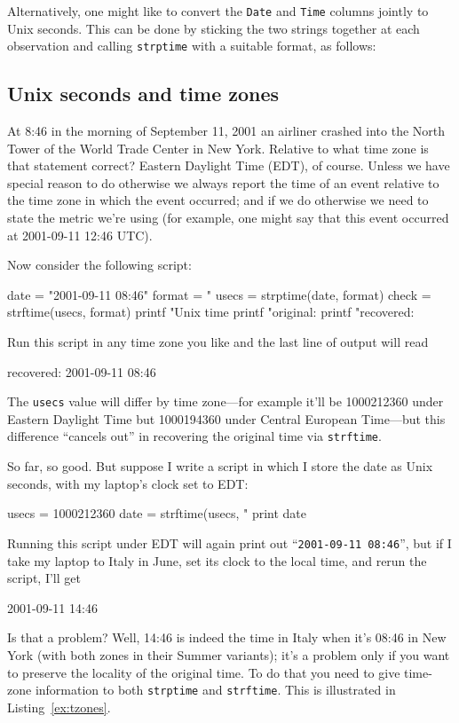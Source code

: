 Alternatively, one might like to convert the \texttt{Date} and
\texttt{Time} columns jointly to Unix seconds. This can be done by
sticking the two strings together at each observation and calling
\texttt{strptime} with a suitable format, as follows:
%

\subsection{Unix seconds and time zones}

At 8:46 in the morning of September 11, 2001 an airliner crashed into
the North Tower of the World Trade Center in New York. Relative to
what time zone is that statement correct? Eastern Daylight Time (EDT),
of course. Unless we have special reason to do otherwise we always
report the time of an event relative to the time zone in which the
event occurred; and if we do otherwise we need to state the metric
we're using (for example, one might say that this event occurred at
2001-09-11 12:46 UTC).

Now consider the following script:
%
\begin{code}
date = "2001-09-11 08:46"
format = "%
usecs = strptime(date, format)
check = strftime(usecs, format)
printf "Unix time %
printf "original:  %
printf "recovered: %
\end{code}

Run this script in any time zone you like and the last line of output
will read
\begin{code}
recovered: 2001-09-11 08:46
\end{code}
The \texttt{usecs} value will differ by time zone---for example it'll
be 1000212360 under Eastern Daylight Time but 1000194360 under Central
European Time---but this difference ``cancels out'' in recovering the
original time via \texttt{strftime}.

So far, so good. But suppose I write a script in which I store the
date as Unix seconds, with my laptop's clock set to EDT:
\begin{code}
usecs = 1000212360
date = strftime(usecs, "%
print date
\end{code}
Running this script under EDT will again print out
``\texttt{2001-09-11 08:46}'', but if I take my laptop to Italy in
June, set its clock to the local time, and rerun the script, I'll get
%
\begin{code}
2001-09-11 14:46
\end{code}
%
Is that a problem? Well, 14:46 is indeed the time in Italy when it's
08:46 in New York (with both zones in their Summer variants); it's a
problem only if you want to preserve the locality of the original
time. To do that you need to give time-zone information to both
\texttt{strptime} and \texttt{strftime}. This is illustrated in
Listing~\ref{ex:tzones}.


